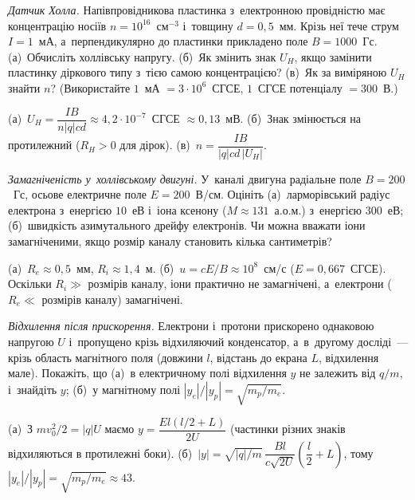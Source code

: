 \begin{problem}\label{prb:HallSensor}
	\emph{Датчик Холла.} Напівпровідникова пластинка з~електронною провідністю має концентрацію носіїв $n = 10^{16}$~см$^{-3}$ і~товщину $d = 0{,}5$~мм. Крізь неї тече струм $I = 1$~мА, а~перпендикулярно до пластинки прикладено поле $B = 1000$~Гс. (а)~Обчисліть холлівську напругу. (б)~Як змінить знак $U_H$, якщо замінити пластинку діркового типу з~тією самою концентрацією? (в)~Як за виміряною $U_H$ знайти $n$? (Використайте $1$~мА $= 3\cdot10^{6}$~СГСЕ, $1$~СГСЕ потенціалу $= 300$~В.)
	\begin{solution}
		(а)~$U_H = \dfrac{IB}{n|q|cd} \approx 4{,}2\cdot10^{-7}$~СГСЕ $\approx 0{,}13$~мВ. (б)~Знак змінюється на протилежний ($R_H>0$ для дірок). (в)~$n = \dfrac{IB}{|q|cd\,|U_H|}$.
	\end{solution}
\end{problem}

\begin{problem}\label{prb:HallThrusterMagnetization}
	\emph{Замагніченість у~холлівському двигуні.} У~каналі двигуна радіальне поле $B = 200$~Гс, осьове електричне поле $E = 200$~В/см. Оцініть (а)~ларморівський радіус електрона з~енергією $10$~еВ і~іона ксенону ($M \approx 131$~а.о.м.) з~енергією $300$~еВ; (б)~швидкість азимутального дрейфу електронів. Чи можна вважати іони замагніченими, якщо розмір каналу становить кілька сантиметрів?
	\begin{solution}
		(а)~$R_e \approx 0{,}5$~мм, $R_i \approx 1{,}4$~м. (б)~$u = cE/B \approx 10^{8}$~см/с ($E = 0{,}667$~СГСЕ). Оскільки $R_i \gg$ розмірів каналу, іони практично не замагнічені, а~електрони ($R_e \ll$ розмірів каналу) замагнічені.
	\end{solution}
\end{problem}

\begin{problem}\label{prb:DeflectionAccelerated}
	\emph{Відхилення після прискорення.} Електрони і~протони прискорено однаковою напругою $U$ і~пропущено крізь відхиляючий конденсатор, а~в~другому досліді~--- крізь область магнітного поля (довжини $l$, відстань до екрана $L$, відхилення мале). Покажіть, що (а)~в електричному полі відхилення $y$ не залежить від $q/m$, і~знайдіть $y$; (б)~у магнітному полі $|y_e|/|y_p| = \sqrt{m_p/m_e}$.
	\begin{solution}
		(а)~З $mv_0^2/2 = |q|U$ маємо $y = \dfrac{El(l/2+L)}{2U}$ (частинки різних знаків відхиляються в протилежні боки). (б)~$|y| = \sqrt{|q|/m}\,\dfrac{Bl}{c\sqrt{2U}}\left(\dfrac{l}{2}+L\right)$, тому $|y_e|/|y_p| = \sqrt{m_p/m_e} \approx 43$.
	\end{solution}
\end{problem}

